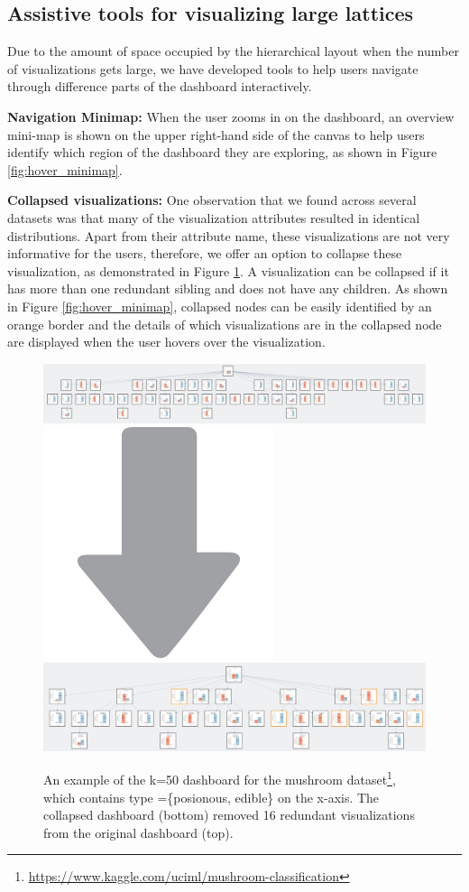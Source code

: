 \subsection{Assistive tools for visualizing large lattices}
Due to the amount of space occupied by the hierarchical layout when the number of visualizations gets large, we have developed tools to help users navigate through difference parts of the dashboard interactively. 
\par \textbf{Navigation Minimap:}  When the user zooms in on the dashboard, an overview mini-map is shown on the upper right-hand side of the canvas to help users identify which region of the dashboard they are exploring, as shown in Figure \ref{fig:hover_minimap}. 
\par \textbf{Collapsed visualizations:} 
One observation that we found across several datasets was that many of the visualization attributes resulted in identical distributions. Apart from their attribute name, these visualizations are not very informative for the users, therefore, we offer an option to collapse these visualization, as demonstrated in Figure \ref{fig:collapse_demo}. A visualization can be collapsed if it has more than one redundant sibling and does not have any children. As shown in Figure \ref{fig:hover_minimap}, collapsed nodes can be easily identified by an orange border and the details of which visualizations are in the collapsed node are displayed when the user hovers over the visualization.
\begin{figure}[ht!]
\centering
\includegraphics[width=\linewidth]{figures/k50_original.jpeg}
\includegraphics[width=0.05\linewidth]{figures/arrow_down.png}
\includegraphics[width=\linewidth]{figures/k50_collapsed.jpeg}
\caption{An example of the k=50 dashboard for the mushroom dataset\footnote{\url{https://www.kaggle.com/uciml/mushroom-classification}}, which contains type =\{posionous, edible\} on the x-axis. The collapsed dashboard (bottom) removed 16 redundant visualizations from the original dashboard (top).}
\label{fig:collapse_demo}
\end{figure}

